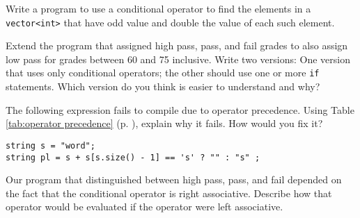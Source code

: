 %
%
\begin{question}
Write a program to use a conditional operator to find the
elements in a \verb|vector<int>| that have odd value and double the value of
each such element.
\end{question}

\begin{question}
Extend the program that assigned high pass, pass, and fail
grades to also assign low pass for grades between 60 and 75 inclusive. Write
two versions: One version that uses only conditional operators; the other
should use one or more \verb|if| statements. Which version do you think is easier
to understand and why?
\end{question}

\begin{question}
The following expression fails to compile due to operator
precedence. Using Table \ref{tab:operator precedence}  (p. \pageref{tab:operator precedence} ), explain why it fails. How would you
fix it?
\begin{lstlisting}
string s = "word";
string pl = s + s[s.size() - 1] == 's' ? "" : "s" ;
\end{lstlisting}
\end{question}

\begin{question}
Our program that distinguished between high pass, pass,
and fail depended on the fact that the conditional operator is right
associative. Describe how that operator would be evaluated if the operator
were left associative.
\end{question}
